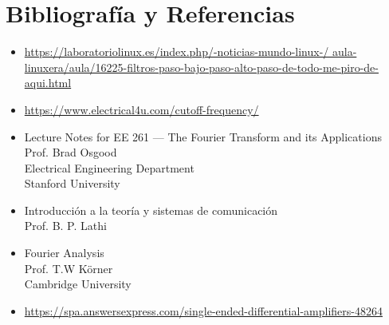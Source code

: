 \documentclass{article}
\begin{document}
{
	
	\clearpage
}

{
	
	\clearpage
}

\section{Bibliografía y Referencias}
\begin{itemize}
	\item \url{https://laboratoriolinux.es/index.php/-noticias-mundo-linux-/
		aula-linuxera/aula/16225-filtros-paso-bajo-paso-alto-paso-de-todo-me-piro-de-aqui.html}
	
	\item \url{https://www.electrical4u.com/cutoff-frequency/}
	
	\item Lecture Notes for EE 261 --- The Fourier Transform and its Applications\\
		Prof. Brad Osgood\\
		Electrical Engineering Department\\
		Stanford University              
	
	\item Introducción a la teoría y sistemas de comunicación                   \\
		Prof. B. P. Lathi   

	\item Fourier Analysis \\
		Prof. T.W Körner    \\
		Cambridge University
	\item \url{https://spa.answersexpress.com/single-ended-differential-amplifiers-48264}
\end{itemize}
\end{document}
